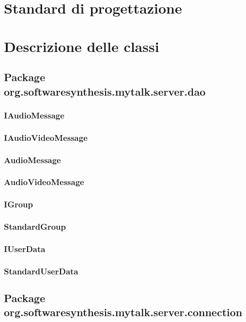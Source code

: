 \section{Standard di progettazione}
\clearpage

\section{Descrizione delle classi}

\subsection{Package org.softwaresynthesis.mytalk.server.dao}

\subsubsection{IAudioMessage}

\subsubsection{IAudioVideoMessage}

\subsubsection{AudioMessage}

\subsubsection{AudioVideoMessage}

\subsubsection{IGroup}

\subsubsection{StandardGroup}

\subsubsection{IUserData}

\subsubsection{StandardUserData}

\subsection{Package org.softwaresynthesis.mytalk.server.connection}

